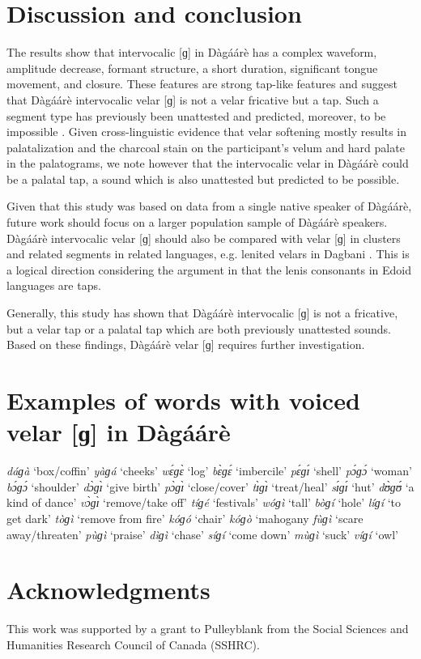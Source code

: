 \documentclass[output=paper, modfonts]{langscibook}
\begin{document}
\section{Discussion and conclusion}
The results show that intervocalic [ɡ] in Dàgáárè has a complex waveform, amplitude decrease, formant structure, a short duration, significant tongue movement, and closure. These features are strong tap-like features and suggest that Dàgáárè intervocalic  velar [ɡ] is not a velar fricative but a tap. Such a segment type has previously been unattested and predicted, moreover, to be impossible \citep{ladefoged1990revised}. Given cross-linguistic evidence that velar softening mostly results in palatalization \citep{halle2005palatalization} and the charcoal stain on the participant's velum and hard palate in the palatograms, we note however that the intervocalic velar in Dàgáárè could be a palatal tap, a sound which is also unattested but predicted to be possible.

Given that this study was based on data from a single native speaker of Dàgáárè, future work should focus on a larger population sample of Dàgáárè speakers. Dàgáárè intervocalic velar [ɡ] should also be compared with velar [ɡ] in clusters and related segments in related languages, e.g. lenited velars in Dagbani \citep{hudu2010dagbani}. This is a logical direction considering the argument in \cite{elugbe1978wider} that the lenis consonants in Edoid languages are taps.


Generally, this study has shown that Dàgáárè intervocalic [ɡ] is not a fricative, but a velar tap or a palatal tap which are both previously unattested sounds. Based on these findings, Dàgáárè velar [ɡ] requires further investigation.


\section*{Examples of words with voiced velar [ɡ] in Dàgáárè}

\begin{multicols}{3}
\ea \textit{d\'aɡ\`a}  `box/coffin'        
\ex \textit{y\`aɡ\'a}  `cheeks'            
\ex \textit{w\'ɛɡ\`ɛ}   `log'              
\ex \textit{b\`ɛɡ\'ɛ}  `imbercile'         
\ex \textit{p\'ɛɡ\'ɪ}  `shell'             
\ex \textit{p\'ɔɡ\'ɔ}  `woman'             
\ex \textit{b\'ɔɡ\'ɔ}  `shoulder'          
\ex \textit{d\`ɔɡ\`ɪ}  `give birth'        
\ex \textit{p\`ɔɡ\`ɪ}  `close/cover'       
\ex \textit{t\`ɪɡ\`ɪ}  `treat/heal'       
\ex \textit{s\'ɪɡ\'ɪ}  `hut'    
\ex \textit{d\`ʊɡ\'ʊ}  `a kind of dance'  
\ex \textit{v\`ɔɡ\`ɪ}  `remove/take off'
\ex \textit{t\'iɡ\'e}  `festivals' 
\ex \textit{w\'oɡ\`i}  `tall' 
\ex \textit{b\`oɡ\'i}  `hole'  
\ex \textit{l\'iɡ\'i}  `to get dark'  
\ex \textit{t\`oɡ\`i}  `remove from fire'   
\ex \textit{k\'oɡ\'o}  `chair'  
\ex \textit{k\'oɡ\`o}  `mahogany 
\ex \textit{f\`uɡ\`i}  `scare away/threaten' 
\ex \textit{p\`uɡ\`i}  `praise' 
\ex \textit{d\`iɡ\`i}  `chase' 
\ex \textit{s\'iɡ\'i}  `come down' 
\ex \textit{m\`uɡ\`i}  `suck'
\ex \textit{v\'iɡ\'i}  `owl'  
\z
\end{multicols}


\section*{Acknowledgments}
This work was supported by a grant to Pulleyblank from the Social Sciences and Humanities Research Council of Canada (SSHRC).

{\sloppy\printbibliography[heading=subbibliography,notkeyword=this]}
\end{document}
